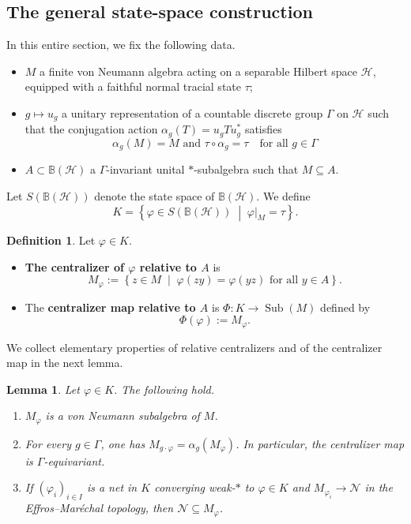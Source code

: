 \documentclass[12pt]{amsart} %
\theoremstyle{plain}
\newtheorem{lemma}[theorem]{Lemma}
\theoremstyle{definition}
\newtheorem{definition}[theorem]{Definition}
\DeclareMathOperator{\Sub}{Sub}
\begin{document}
\subsection{The general state-space construction}
\label{subsec:generalconstruction} In this entire section, we fix the following data.
\begin{itemize}
    \item $M$ a finite von Neumann algebra acting on a separable Hilbert space $\mathcal{H}$, equipped with a faithful normal tracial state $\tau$;
    \item $g \mapsto u_g$ a unitary representation of a countable discrete group $\Gamma$ on $\mathcal{H}$ such that the conjugation action $\alpha_g(T) = u_g T u_g^*$ satisfies $$\alpha_g(M)=M\text{ and }\tau \circ \alpha_g = \tau\quad\text{for all }g\in\Gamma$$
    \item $A \subset \mathbb{B}(\mathcal{H})$ a $\Gamma$-invariant unital $*$-subalgebra such that $M \subseteq A$.
\end{itemize}
\noindent Let $S(\mathbb{B}(\mathcal{H}))$ denote the state space of $\mathbb{B}(\mathcal{H})$. We define
$$K = \left\{ \varphi \in S(\mathbb{B}(\mathcal{H})) \;\middle|\; \varphi|_{M} = \tau \right\}.$$
\begin{definition}
Let $\varphi\in K$.
\begin{itemize}
    \item \textbf{The centralizer of $\varphi$ relative to $A$} is
$$M_\varphi := \left\{ z \in M \;\middle|\; \varphi(zy) = \varphi(yz) \text{ for all } y \in A \right\}.$$
\item The \textbf{centralizer map relative to $A$} is $\Phi:K\to\Sub(M)$ defined by $$\Phi(\varphi):=M_\varphi.$$
\end{itemize}
\end{definition}
\noindent We collect elementary properties of relative centralizers and of the centralizer map in the next lemma.
\begin{lemma}\label{lem:fix-is-subalgebra}
Let $\varphi\in K$. The following hold.
\begin{enumerate}
\item $M_\varphi$ is a von Neumann subalgebra of $M$.
\item For every $g\in\Gamma$, one has $M_{g\cdot\varphi}=\alpha_g(M_\varphi)$. In particular, the centralizer map is $\Gamma$-equivariant.
\item If $(\varphi_i)_{i\in I}$ is a net in $K$ converging weak-$*$ to $\varphi\in K$ and $M_{\varphi_i}\to\mathcal N$ in the Effros--Mar\'echal topology, then $\mathcal N\subseteq M_\varphi$.
\end{enumerate}
\end{lemma}
\end{document}
